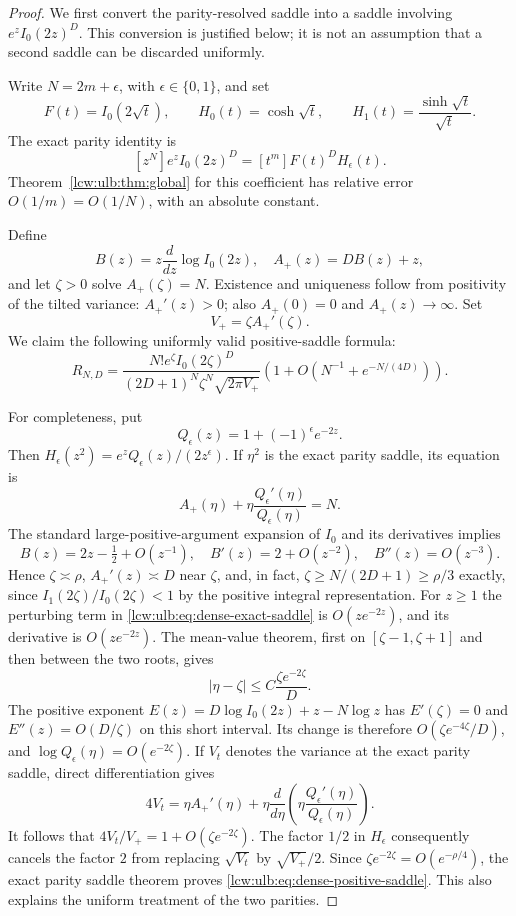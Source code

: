 \documentclass[11pt,letterpaper]{article}
\theoremstyle{remark}\newtheorem{remark}[theorem]{Remark}
\begin{document}
\begin{proof}
We first convert the parity-resolved saddle into a saddle involving
$e^z I_0(2z)^D$. This conversion is justified below; it is not an
assumption that a second saddle can be discarded uniformly.

Write $N=2m+\epsilon$, with $\epsilon\in\{0,1\}$, and set
\[
 F(t)=I_0(2\sqrt t),\qquad
 H_0(t)=\cosh\sqrt t,\qquad
 H_1(t)=\frac{\sinh\sqrt t}{\sqrt t}.
\]
The exact parity identity is
\[
 [z^N]e^zI_0(2z)^D=[t^m]F(t)^DH_\epsilon(t).
\]
Theorem~\ref{lcw:ulb:thm:global} for this coefficient has relative
error $O(1/m)=O(1/N)$, with an absolute constant.

Define
\[
 B(z)=z\frac{d}{dz}\log I_0(2z),\quad
 A_+(z)=DB(z)+z,
\]
and let $\zeta>0$ solve $A_+(\zeta)=N$. Existence and uniqueness
follow from positivity of the tilted variance: $A_+'(z)>0$;
also $A_+(0)=0$ and $A_+(z)\to\infty$. Set
\[
 V_+=\zeta A_+'(\zeta).
\]
We claim the following uniformly valid positive-saddle formula:
\begin{equation}\label{lcw:ulb:eq:dense-positive-saddle}
 R_{N,D}=
 \frac{N!e^{\zeta}I_0(2\zeta)^D}
 {(2D+1)^N\zeta^N\sqrt{2\pi V_+}}
 \left(1+O\left(N^{-1}+e^{-N/(4D)}\right)\right).
\end{equation}

For completeness, put
\[
 Q_\epsilon(z)=1+(-1)^\epsilon e^{-2z}.
\]
Then $H_\epsilon(z^2)=e^zQ_\epsilon(z)/(2z^\epsilon)$.
If $\eta^2$ is the exact parity saddle, its equation is
\begin{equation}\label{lcw:ulb:eq:dense-exact-saddle}
 A_+(\eta)+\eta\frac{Q_\epsilon'(\eta)}{Q_\epsilon(\eta)}=N.
\end{equation}
The standard large-positive-argument expansion of $I_0$ and its
derivatives implies
\[
 B(z)=2z-\tfrac12+O(z^{-1}),\quad
 B'(z)=2+O(z^{-2}),\quad B''(z)=O(z^{-3}).
\]
Hence $\zeta\asymp\rho$, $A_+'(z)\asymp D$ near $\zeta$,
and, in fact, $\zeta\ge N/(2D+1)\ge\rho/3$ exactly, since
$I_1(2\zeta)/I_0(2\zeta)<1$ by the positive integral representation.
For $z\ge1$ the perturbing term in
\eqref{lcw:ulb:eq:dense-exact-saddle} is $O(ze^{-2z})$, and its derivative
is $O(ze^{-2z})$. The mean-value theorem, first on
$[\zeta-1,\zeta+1]$ and then between the two roots, gives
\[
 |\eta-\zeta|\le C\frac{\zeta e^{-2\zeta}}D.
\]
The positive exponent
$E(z)=D\log I_0(2z)+z-N\log z$ has $E'(\zeta)=0$ and
$E''(z)=O(D/\zeta)$ on this short interval. Its change is therefore
$O(\zeta e^{-4\zeta}/D)$, and $\log Q_\epsilon(\eta)=O(e^{-2\zeta})$.
If $V_t$ denotes the variance at the exact parity saddle, direct
differentiation gives
\[
 4V_t=\eta A_+'(\eta)+
 \eta\frac{d}{d\eta}\left(
       \eta\frac{Q_\epsilon'(\eta)}{Q_\epsilon(\eta)}\right).
\]
It follows that $4V_t/V_+=1+O(\zeta e^{-2\zeta})$.
The factor $1/2$ in $H_\epsilon$ consequently cancels the factor
$2$ from replacing $\sqrt{V_t}$ by $\sqrt{V_+}/2$.
Since $\zeta e^{-2\zeta}=O(e^{-\rho/4})$, the exact parity
saddle theorem proves \eqref{lcw:ulb:eq:dense-positive-saddle}.
This also explains the uniform treatment of the two parities.


\end{proof}
\end{document}
